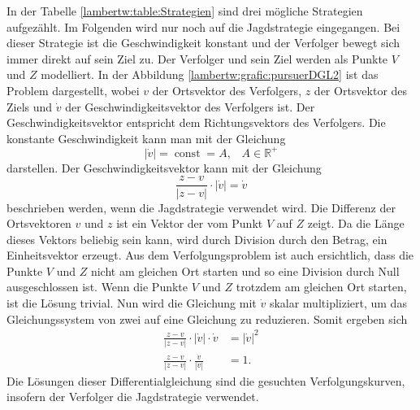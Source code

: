%
In der Tabelle \ref{lambertw:table:Strategien} sind drei mögliche Strategien aufgezählt.
Im Folgenden wird nur noch auf die Jagdstrategie eingegangen.
Bei dieser Strategie ist die Geschwindigkeit konstant und der Verfolger bewegt sich immer direkt auf sein Ziel zu.
Der Verfolger und sein Ziel werden als Punkte $V$ und $Z$ modelliert.
In der Abbildung \ref{lambertw:grafic:pursuerDGL2} ist das Problem dargestellt,
wobei $v$ der Ortsvektor des Verfolgers, $z$ der Ortsvektor des Ziels und $\dot{v}$ der Geschwindigkeitsvektor des Verfolgers ist.
Der Geschwindigkeitsvektor entspricht dem Richtungsvektors des Verfolgers.
Die konstante Geschwindigkeit kann man mit der Gleichung
%
\begin{equation}
    |\dot{v}|
    = \operatorname{const} = A
    \text{,}\quad A\in\mathbb{R}^+
\end{equation}
%
darstellen. Der Geschwindigkeitsvektor kann mit der Gleichung
%
\begin{equation}
    \frac{z-v}{|z-v|}\cdot|\dot{v}|
    =
    \dot{v}
\end{equation}
%
beschrieben werden, wenn die Jagdstrategie verwendet wird.
Die Differenz der Ortsvektoren $v$ und $z$ ist ein Vektor der vom Punkt $V$ auf $Z$ zeigt.
Da die Länge dieses Vektors beliebig sein kann, wird durch Division durch den Betrag, ein Einheitsvektor erzeugt.
Aus dem Verfolgungsproblem ist auch ersichtlich, dass die Punkte $V$ und $Z$ nicht am gleichen Ort starten und so eine Division durch Null ausgeschlossen ist.
Wenn die Punkte $V$ und $Z$ trotzdem am gleichen Ort starten, ist die Lösung trivial.
%
Nun wird die Gleichung mit $\dot{v}$ skalar multipliziert, um das Gleichungssystem von zwei auf eine Gleichung zu reduzieren. Somit ergeben sich
\begin{align}
    \frac{z-v}{|z-v|}\cdot|\dot{v}|\cdot\dot{v}
    &=
    |\dot{v}|^2
    \\
    \label{lambertw:pursuerDGL}
    \frac{z-v}{|z-v|}\cdot \frac{\dot{v}}{|\dot{v}|}
    &=
    1 \text{.}
\end{align}
Die Lösungen dieser Differentialgleichung sind die gesuchten Verfolgungskurven, insofern der Verfolger die Jagdstrategie verwendet.
%
